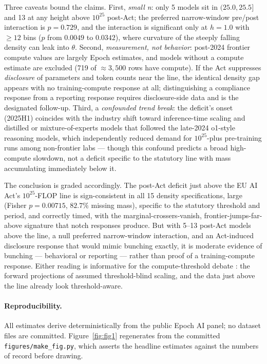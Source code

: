 \documentclass[11pt]{article}
\begin{document}
Three caveats bound the claims. First, \emph{small n}: only 5 models sit in
$(25.0, 25.5]$ and 13 at any height above $10^{25}$ post-Act; the preferred
narrow-window pre/post interaction is $p=0.729$, and the interaction is
significant only at $h=1.0$ with $\geq 12$ bins ($p$ from $0.0049$ to
$0.0342$), where curvature of the steeply falling density can leak into
$\theta$. Second, \emph{measurement, not behavior}: post-2024 frontier
compute values are largely Epoch estimates, and models without a compute
estimate are excluded (719 of $\approx 3{,}500$ rows have compute). If the
Act suppresses \emph{disclosure} of parameters and token counts near the
line, the identical density gap appears with no training-compute response at
all; distinguishing a compliance response from a reporting response requires
disclosure-side data and is the designated follow-up. Third, a
\emph{confounded trend break}: the deficit's onset (2025H1) coincides with
the industry shift toward inference-time scaling and distilled or
mixture-of-experts models that followed the late-2024 o1-style reasoning
models, which independently reduced demand for $10^{25}$-plus pre-training
runs among non-frontier labs --- though this confound predicts a broad
high-compute slowdown, not a deficit specific to the statutory line with
mass accumulating immediately below it.

The conclusion is graded accordingly. The post-Act deficit just above the EU
AI Act's $10^{25}$-FLOP line is sign-consistent in all 15 density
specifications, large (Fisher $p=0.00715$, $82.7\%$ missing mass), specific
to the statutory threshold and period, and correctly timed, with the
marginal-crossers-vanish, frontier-jumps-far-above signature that notch
responses produce. But with 5--13 post-Act models above the line, a null
preferred narrow-window interaction, and an Act-induced disclosure response
that would mimic bunching exactly, it is moderate evidence of bunching ---
behavioral or reporting --- rather than proof of a training-compute
response. Either reading is informative for the compute-threshold debate
\cite{heimkoessler2024,hooker2024}: the forward projections of
\cite{kumarmanning2025} assumed threshold-blind scaling, and the data just
above the line already look threshold-aware.

\paragraph{Reproducibility.} All estimates derive deterministically from the
public Epoch AI panel; no dataset files are committed.
Figure~\ref{fig:fig1} regenerates from the committed
\texttt{figures/make\_fig.py}, which asserts the headline estimates against
the numbers of record before drawing.
\end{document}
